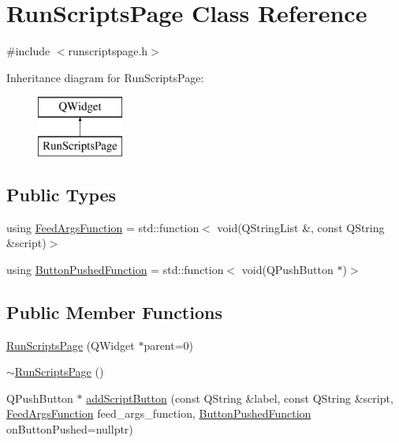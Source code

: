 \hypertarget{class_run_scripts_page}{}\section{Run\+Scripts\+Page Class Reference}
\label{class_run_scripts_page}


{\ttfamily \#include $<$runscriptspage.\+h$>$}

Inheritance diagram for Run\+Scripts\+Page\+:\begin{figure}[H]
\begin{center}
\leavevmode
\includegraphics[height=2.000000cm]{d4/d9b/class_run_scripts_page}
\end{center}
\end{figure}
\subsection*{Public Types}
\begin{DoxyCompactItemize}
\item 
using \mbox{\hyperlink{class_run_scripts_page_a74087fa5854e30f514a6e807bf55ca69}{Feed\+Args\+Function}} = std\+::function$<$ void(Q\+String\+List \&, const Q\+String \&script)$>$
\item 
using \mbox{\hyperlink{class_run_scripts_page_ab4304d9dd110792503447f673b7e6a3b}{Button\+Pushed\+Function}} = std\+::function$<$ void(Q\+Push\+Button $\ast$)$>$
\end{DoxyCompactItemize}
\subsection*{Public Member Functions}
\begin{DoxyCompactItemize}
\item 
\mbox{\hyperlink{class_run_scripts_page_ae85074da850d5f2459935b0d9b40b65b}{Run\+Scripts\+Page}} (Q\+Widget $\ast$parent=0)
\item 
\mbox{\hyperlink{class_run_scripts_page_af2e07024df0bdb72c31277a979f13287}{$\sim$\+Run\+Scripts\+Page}} ()
\item 
Q\+Push\+Button $\ast$ \mbox{\hyperlink{class_run_scripts_page_ab41d6b1a13175ac06d9c7c6732404b2f}{add\+Script\+Button}} (const Q\+String \&label, const Q\+String \&script, \mbox{\hyperlink{class_run_scripts_page_a74087fa5854e30f514a6e807bf55ca69}{Feed\+Args\+Function}} feed\+\_\+args\+\_\+function, \mbox{\hyperlink{class_run_scripts_page_ab4304d9dd110792503447f673b7e6a3b}{Button\+Pushed\+Function}} on\+Button\+Pushed=nullptr)
\end{DoxyCompactItemize}


